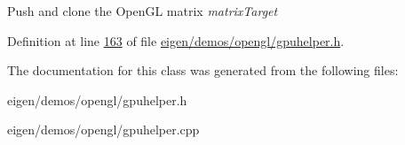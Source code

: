 Push and clone the Open\+GL matrix {\itshape matrix\+Target} 

Definition at line \hyperlink{eigen_2demos_2opengl_2gpuhelper_8h_source_l00163}{163} of file \hyperlink{eigen_2demos_2opengl_2gpuhelper_8h_source}{eigen/demos/opengl/gpuhelper.\+h}.



The documentation for this class was generated from the following files\+:\begin{DoxyCompactItemize}
\item 
eigen/demos/opengl/gpuhelper.\+h\item 
eigen/demos/opengl/gpuhelper.\+cpp\end{DoxyCompactItemize}
